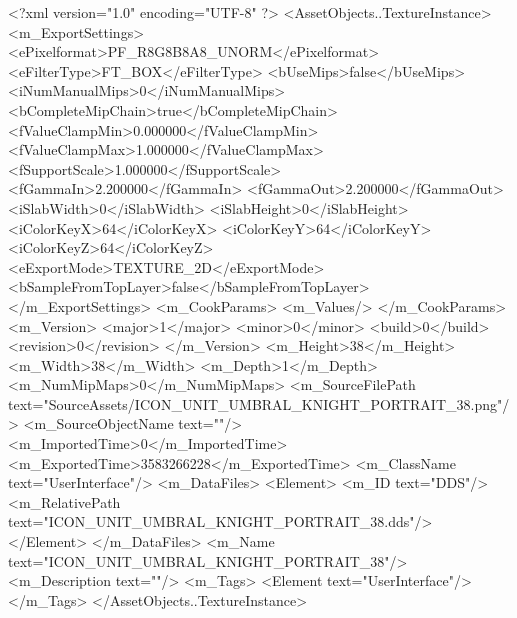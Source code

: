 <?xml version="1.0" encoding="UTF-8" ?>
<AssetObjects..TextureInstance>
	<m_ExportSettings>
		<ePixelformat>PF_R8G8B8A8_UNORM</ePixelformat>
		<eFilterType>FT_BOX</eFilterType>
		<bUseMips>false</bUseMips>
		<iNumManualMips>0</iNumManualMips>
		<bCompleteMipChain>true</bCompleteMipChain>
		<fValueClampMin>0.000000</fValueClampMin>
		<fValueClampMax>1.000000</fValueClampMax>
		<fSupportScale>1.000000</fSupportScale>
		<fGammaIn>2.200000</fGammaIn>
		<fGammaOut>2.200000</fGammaOut>
		<iSlabWidth>0</iSlabWidth>
		<iSlabHeight>0</iSlabHeight>
		<iColorKeyX>64</iColorKeyX>
		<iColorKeyY>64</iColorKeyY>
		<iColorKeyZ>64</iColorKeyZ>
		<eExportMode>TEXTURE_2D</eExportMode>
		<bSampleFromTopLayer>false</bSampleFromTopLayer>
	</m_ExportSettings>
	<m_CookParams>
		<m_Values/>
	</m_CookParams>
	<m_Version>
		<major>1</major>
		<minor>0</minor>
		<build>0</build>
		<revision>0</revision>
	</m_Version>
	<m_Height>38</m_Height>
	<m_Width>38</m_Width>
	<m_Depth>1</m_Depth>
	<m_NumMipMaps>0</m_NumMipMaps>
	<m_SourceFilePath text="SourceAssets/ICON_UNIT_UMBRAL_KNIGHT_PORTRAIT_38.png"/>
	<m_SourceObjectName text=""/>
	<m_ImportedTime>0</m_ImportedTime>
	<m_ExportedTime>3583266228</m_ExportedTime>
	<m_ClassName text="UserInterface"/>
	<m_DataFiles>
		<Element>
			<m_ID text="DDS"/>
			<m_RelativePath text="ICON_UNIT_UMBRAL_KNIGHT_PORTRAIT_38.dds"/>
		</Element>
	</m_DataFiles>
	<m_Name text="ICON_UNIT_UMBRAL_KNIGHT_PORTRAIT_38"/>
	<m_Description text=""/>
	<m_Tags>
		<Element text="UserInterface"/>
	</m_Tags>
</AssetObjects..TextureInstance>

